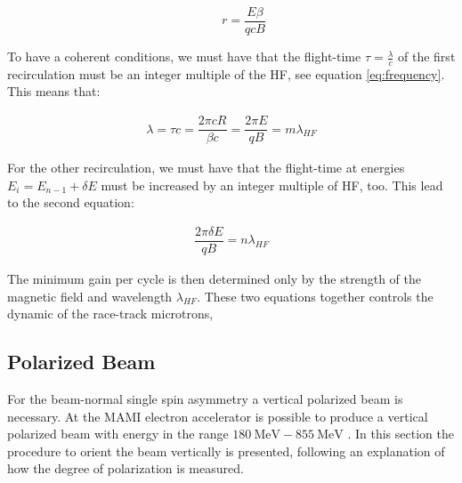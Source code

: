 \begin{equation}
\qquad r = \dfrac{E \beta}{qcB}
\end{equation}

To have a coherent conditions, we must have that the flight-time $\tau = \frac{\lambda}{c}$ of the first recirculation must be an integer multiple of the HF, see equation \ref{eq:frequency}. This means that:

\begin{align*}
\lambda = \tau c =\dfrac{ 2 \pi c R }{\beta c} = \dfrac{2 \pi E}{q B} = m \lambda_{HF}
\end{align*}

For the other recirculation, we must have that the flight-time at energies $E_{i} = E_{n-1} + \delta E$ must be increased by an integer multiple of HF, too. This lead to the second equation:

\begin{align*}
\dfrac{2 \pi \delta E}{q B} = n \lambda_{HF}
\end{align*}

The minimum gain per cycle is then determined only by the strength of the magnetic field and wavelength $\lambda_{HF}$. These two equations together controls the dynamic of the race-track microtrons,

\subsection{Polarized Beam}
 \medskip

For the beam-normal single spin asymmetry a vertical polarized beam is necessary. At the MAMI electron accelerator is possible to produce a vertical polarized beam with energy in the range $\SI{180}{\mega \electronvolt} - \SI{855}{\mega \electronvolt}$ \cite{Schlimme:2016rrp}. In this section the procedure to orient the beam vertically is presented, following an explanation of how the degree of polarization is measured. \medskip

